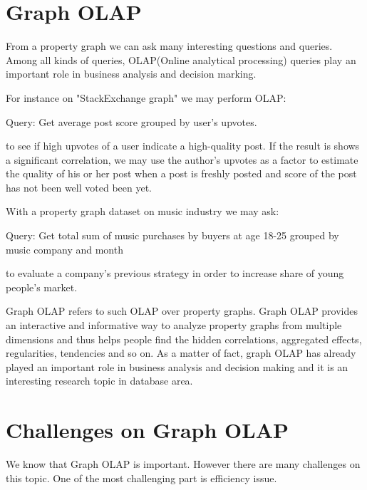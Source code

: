 \section{Graph OLAP}


From a property graph we can ask many interesting questions and queries. Among all kinds of queries, OLAP(Online analytical processing) queries play an important role in business analysis and decision marking. 
 
For instance on "StackExchange graph" we may perform OLAP:

Query: 		Get average post score grouped by user’s upvotes. 

to see if high upvotes of a user indicate a high-quality post. If the result is shows a significant correlation, we may use the author’s upvotes as a factor to estimate the quality of his or her post when a post is freshly posted and score of the post has not been well voted been yet.


With a property graph dataset on music industry we may ask:

Query: 		Get total sum of music purchases by buyers at age 18-25 grouped by music company and month

to evaluate a company's previous strategy in order to increase share of young people's market.

Graph OLAP refers to such OLAP over property graphs. Graph OLAP provides an interactive and informative way to analyze property graphs from multiple dimensions and thus helps people find the hidden correlations, aggregated effects, regularities, tendencies and so on. As a matter of fact, graph OLAP has already played an important role in business analysis and decision making and it is an interesting research topic in database area.



\section{Challenges on Graph OLAP}

We know that Graph OLAP is important. However there are many challenges on this topic. One of the most challenging part is efficiency issue. 

